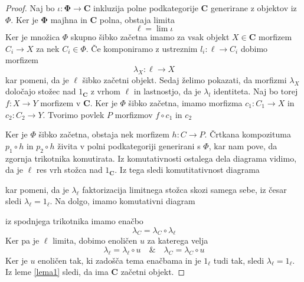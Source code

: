 \documentclass[12pt,a4paper]{book}
\theoremstyle{definition}
\theoremstyle{plain}
\theoremstyle{definition}
\theoremstyle{remark}
\newcommand{\cat}[1]{\textbf{#1}}
\begin{document}
\begin{proof}
Naj bo $\iota : \bm{\Phi} \to \cat{C}$ inkluzija polne podkategorije $\cat{C}$ generirane z objektov iz $\Phi$. Ker je $\bm{\Phi}$ majhna in $\cat{C}$ polna, obstaja limita
$$\ell = \lim \iota$$
Ker je množica $\Phi$ skupno šibko začetna imamo za vsak objekt $X \in \cat{C}$ morfizem $C_i \to X$ za nek $C_i \in \Phi$. Če komponiramo z ustreznim $l_i : \ell \to C_i$ dobimo morfizem
$$\lambda_X : \ell \to X$$
kar pomeni, da je $\ell$ šibko začetni objekt. Sedaj želimo pokazati, da morfizmi $\lambda_X$ določajo stožec nad $1_\cat{C}$ z vrhom $\ell$ in lastnostjo, da je $\lambda_l$ identiteta. Naj bo torej $f : X \to Y$ morfizem v $\cat{C}$. Ker je $\Phi$ šibko začetna, imamo morfizma $c_1 : C_1 \to X$ in $c_2 : C_2 \to Y$. Tvorimo povlek $P$ morfizmov $f \circ c_1$ in $c_2$
\begin{center}
\end{center}
Ker je $\Phi$ šibko začetna, obstaja nek morfizem $h : C \to P$. Črtkana kompozituma $p_1 \circ h$ in $p_2 \circ h$ živita v polni podkategoriji generirani s $\Phi$, kar nam pove, da zgornja trikotnika komutirata. Iz komutativnosti ostalega dela diagrama vidimo, da je $\ell$ res vrh stožca nad $1_\cat{C}$. Iz tega sledi komutitativnost diagrama
\begin{center}
\end{center}
kar pomeni, da je $\lambda_\ell$ faktorizacija limitnega stožca skozi samega sebe, iz česar sledi $\lambda_\ell = 1_\ell$. Na dolgo, imamo komutativni diagram
\begin{center}
\end{center}
iz spodnjega trikotnika imamo enačbo
$$\lambda_C = \lambda_C \circ \lambda_\ell$$
Ker pa je $\ell$ limita, dobimo enoličen $u$ za katerega velja
$$\lambda_\ell = \lambda_\ell \circ u \quad \& \quad \lambda_C = \lambda_C \circ u$$
Ker je $u$ enoličen tak, ki zadošča tema enačbama in je $1_\ell$ tudi tak, sledi $\lambda_\ell = 1_\ell$. Iz leme \ref{lema1} sledi, da ima $\cat{C}$ začetni objekt.
\end{proof}
\end{document}
